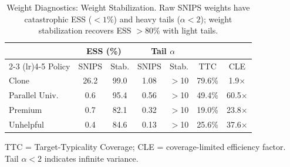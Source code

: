 \begin{table}[t]
\centering
\caption{Weight Diagnostics: Weight Stabilization. Raw SNIPS weights have catastrophic ESS ($<1\%$) and heavy tails ($\alpha < 2$); weight stabilization recovers ESS $>80\%$ with light tails.}
\label{tab:weight-diagnostics}
\small
\setlength{\tabcolsep}{5pt}
\begin{tabular}{lcccccc}
\toprule
& \multicolumn{2}{c}{ESS (\%)}  & \multicolumn{2}{c}{Tail $\alpha$} & & \\
\cmidrule(lr){2-3} \cmidrule(lr){4-5}
Policy & SNIPS & Stab. & SNIPS & Stab. & TTC & CLE \\
\midrule
Clone & 26.2 & 99.0 & 1.08 & $>$10 & 79.6\% & 1.9$\times$ \\
Parallel Univ. & 0.6 & 95.4 & 0.56 & $>$10 & 49.4\% & 60.5$\times$ \\
Premium & 0.7 & 82.1 & 0.32 & $>$10 & 19.0\% & 23.8$\times$ \\
Unhelpful & 0.4 & 84.6 & 0.13 & $>$10 & 25.6\% & 37.6$\times$ \\
\bottomrule
\end{tabular}

\vspace{1mm}
\footnotesize{TTC = Target-Typicality Coverage; CLE = coverage-limited efficiency factor. Tail $\alpha < 2$ indicates infinite variance.}
\end{table}
